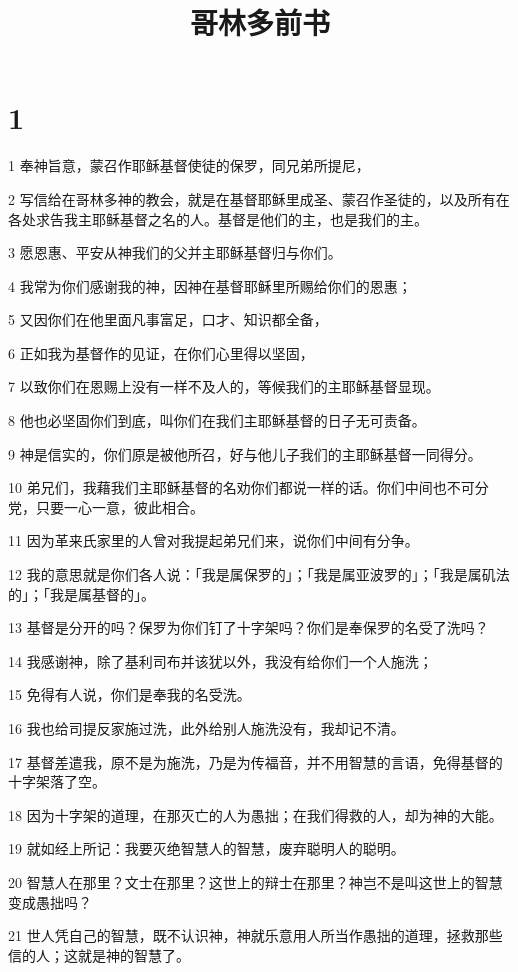 

\title{哥林多前书}


\chapter{1}

\par 1 奉神旨意，蒙召作耶稣基督使徒的保罗，同兄弟所提尼，
\par 2 写信给在哥林多神的教会，就是在基督耶稣里成圣、蒙召作圣徒的，以及所有在各处求告我主耶稣基督之名的人。基督是他们的主，也是我们的主。
\par 3 愿恩惠、平安从神我们的父并主耶稣基督归与你们。
\par 4 我常为你们感谢我的神，因神在基督耶稣里所赐给你们的恩惠；
\par 5 又因你们在他里面凡事富足，口才、知识都全备，
\par 6 正如我为基督作的见证，在你们心里得以坚固，
\par 7 以致你们在恩赐上没有一样不及人的，等候我们的主耶稣基督显现。
\par 8 他也必坚固你们到底，叫你们在我们主耶稣基督的日子无可责备。
\par 9 神是信实的，你们原是被他所召，好与他儿子我们的主耶稣基督一同得分。
\par 10 弟兄们，我藉我们主耶稣基督的名劝你们都说一样的话。你们中间也不可分党，只要一心一意，彼此相合。
\par 11 因为革来氏家里的人曾对我提起弟兄们来，说你们中间有分争。
\par 12 我的意思就是你们各人说：「我是属保罗的」；「我是属亚波罗的」；「我是属矶法的」；「我是属基督的」。
\par 13 基督是分开的吗？保罗为你们钉了十字架吗？你们是奉保罗的名受了洗吗？
\par 14 我感谢神，除了基利司布并该犹以外，我没有给你们一个人施洗；
\par 15 免得有人说，你们是奉我的名受洗。
\par 16 我也给司提反家施过洗，此外给别人施洗没有，我却记不清。
\par 17 基督差遣我，原不是为施洗，乃是为传福音，并不用智慧的言语，免得基督的十字架落了空。
\par 18 因为十字架的道理，在那灭亡的人为愚拙；在我们得救的人，却为神的大能。
\par 19 就如经上所记：我要灭绝智慧人的智慧，废弃聪明人的聪明。
\par 20 智慧人在那里？文士在那里？这世上的辩士在那里？神岂不是叫这世上的智慧变成愚拙吗？
\par 21 世人凭自己的智慧，既不认识神，神就乐意用人所当作愚拙的道理，拯救那些信的人；这就是神的智慧了。
